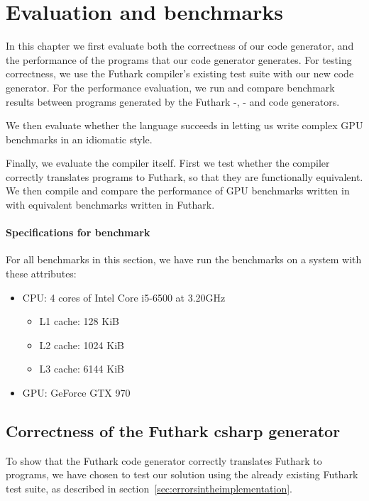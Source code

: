 \chapter{Evaluation and benchmarks}
In this chapter we first evaluate both the correctness of our code generator,
and the performance of the \csharp{} programs that our code generator generates.
For testing correctness, we use the Futhark compiler's existing test suite with
our new code generator. For the performance evaluation, we run and compare benchmark
results between programs generated by the Futhark \csharp{}-, \clang{}- and \Python{} code generators.

We then evaluate whether the \fshark{} language succeeds in letting us write
complex GPU benchmarks in an idiomatic \fsharp{} style.

Finally, we evaluate the \fshark{} compiler itself. First we test whether the
\fshark{} compiler correctly translates \fshark{} programs to Futhark, so that
they are functionally equivalent.
We then compile and compare the performance of GPU benchmarks written in
\fshark{} with equivalent benchmarks written in Futhark.
\subsubsection*{Specifications for benchmark}
For all benchmarks in this section, we have run the benchmarks on a system with
these attributes:
\begin{itemize}
\item CPU: 4 cores of Intel Core i5-6500 at 3.20GHz
  \begin{itemize}
  \item L1 cache: 128 KiB 
  \item L2 cache: 1024 KiB 
  \item L3 cache: 6144 KiB 
  \end{itemize}
\item GPU: GeForce GTX 970
\end{itemize}

\section{Correctness of the Futhark csharp{} generator}
\label{subsec:futharkcsharpcorrectness}
To show that the Futhark \csharp{} code generator correctly translates Futhark
to \csharp{} programs, we have chosen to test our solution using the already existing Futhark test
suite, as described in section~\ref{sec:errorsintheimplementation}.

